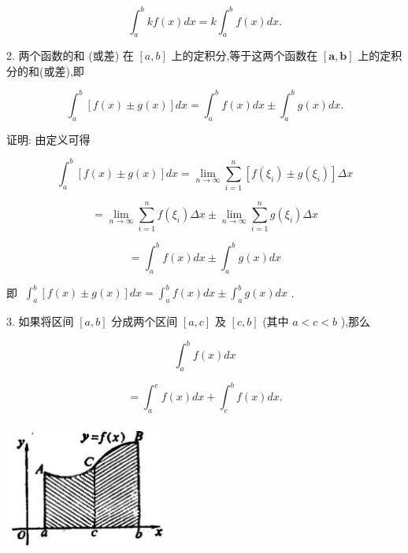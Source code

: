 \documentclass[10pt]{article}
\begin{document}
\[
{\int }_{a}^{b}{kf}\left( x\right) {dx} = k{\int }_{a}^{b}f\left( x\right) {dx}.
\]

2. 两个函数的和 (或差) 在 \(\left\lbrack {a,b}\right\rbrack\) 上的定积分,等于这两个函数在 \(\left\lbrack {\mathbf{a},\mathbf{b}}\right\rbrack\) 上的定积分的和(或差),即

\[
{\int }_{a}^{b}\left\lbrack {f\left( x\right) \pm g\left( x\right) }\right\rbrack {dx} = {\int }_{a}^{b}f\left( x\right) {dx} \pm {\int }_{a}^{b}g\left( x\right) {dx}.
\]

证明: 由定义可得

\[
{\int }_{a}^{b}\left\lbrack {f\left( x\right) \pm g\left( x\right) }\right\rbrack {dx} = \mathop{\lim }\limits_{{n \rightarrow \infty }}\mathop{\sum }\limits_{{i = 1}}^{n}\left\lbrack {f\left( {\xi }_{i}\right) \pm g\left( {\xi }_{i}\right) }\right\rbrack {\Delta x}
\]

\[
= \mathop{\lim }\limits_{{n \rightarrow \infty }}\mathop{\sum }\limits_{{i = 1}}^{n}f\left( {\xi }_{i}\right) {\Delta x} \pm \mathop{\lim }\limits_{{n \rightarrow \infty }}\mathop{\sum }\limits_{{i = 1}}^{n}g\left( {\xi }_{i}\right) {\Delta x}
\]

\[
= {\int }_{a}^{b}f\left( x\right) {dx} \pm {\int }_{a}^{b}g\left( x\right) {dx}
\]

即 \(\;{\int }_{a}^{b}\left\lbrack {f\left( x\right) \pm g\left( x\right) }\right\rbrack {dx} = {\int }_{a}^{b}f\left( x\right) {dx} \pm {\int }_{a}^{b}g\left( x\right) {dx}\) .

3. 如果将区间 \(\left\lbrack {a,b}\right\rbrack\) 分成两个区间 \(\left\lbrack {a,c}\right\rbrack\) 及 \(\left\lbrack {c,b}\right\rbrack\) (其中 \(a < c < b\) ),那么

\[
{\int }_{a}^{b}f\left( x\right) {dx}
\]

\[
= {\int }_{a}^{c}f\left( x\right) {dx} + {\int }_{c}^{b}f\left( x\right) {dx}.
\]

\begin{center}
\includegraphics[max width=0.4\textwidth]{images/01912c18-5c3f-733d-b775-749ba9897a9d_224_842112.jpg}
\end{center}
\end{document}

